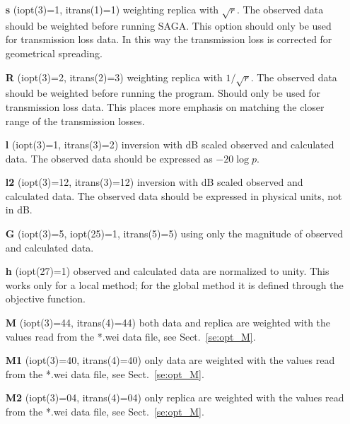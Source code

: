 \documentclass{saclantc}
\begin{document}
\begin{itemize}
    \item[{\bf s}] (iopt(3)=1, itrans(1)=1)  weighting replica  with $\sqrt{r}$. 
The observed data should be weighted before running {\sf SAGA}. 
This option should only be used for transmission loss data.
In this way the transmission loss is corrected for geometrical spreading.
\vspace{-0.3cm}

    \item[{\bf R}] (iopt(3)=2, itrans(2)=3)  weighting replica with $1/ \sqrt{r}$.
The observed data should be weighted before running the program. Should only
be used for transmission loss data.
 This places more
emphasis on matching the closer range of the transmission losses.
\vspace{-0.3cm}
    \item[{\bf l}] (iopt(3)=1, itrans(3)=2) inversion  with  dB scaled observed
and calculated data. The  observed data should be expressed as $-20 \log p $.
\vspace{-0.3cm}
    \item[{\bf l2}] (iopt(3)=12, itrans(3)=12) inversion  with  dB scaled observed
and calculated data. The  observed data should be expressed in
    physical units, not in dB.
\vspace{-0.3cm}
    \item[{\bf G}] (iopt(3)=5, iopt(25)=1, itrans(5)=5) using only the magnitude of
observed and calculated data.
\vspace{-0.3cm}
    \item[{\bf h}] (iopt(27)=1)     observed and calculated
data are normalized to unity. This works only for a local method; for the
global method it is defined through the objective function. 
\vspace{-0.3cm}
    \item[{\bf M}] (iopt(3)=44, itrans(4)=44) both data and replica are 
weighted with the values read from the *.wei data file,
see Sect.\ \ref{se:opt_M}.
\vspace{-0.3cm}
    \item[{\bf M1}] (iopt(3)=40, itrans(4)=40) only  data are 
weighted with the values read from the *.wei data file,
see Sect.\ \ref{se:opt_M}.
\vspace{-0.3cm}
    \item[{\bf M2}] (iopt(3)=04, itrans(4)=04) only replica are 
weighted with the values read from the *.wei data file,
see Sect.\ \ref{se:opt_M}.
\end{itemize}
\end{document}
